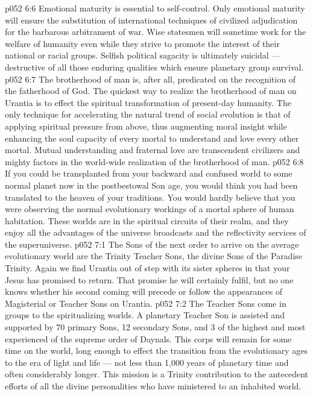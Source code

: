 \vs p052 6:6 \bibnobreakspace {} Emotional maturity is essential to self\hyp{}control. Only emotional maturity will ensure the substitution of international techniques of civilized adjudication for the barbarous arbitrament of war. Wise statesmen will sometime work for the welfare of humanity even while they strive to promote the interest of their national or racial groups. Selfish political sagacity is ultimately suicidal --- destructive of all those enduring qualities which ensure planetary group survival.
\vs p052 6:7 \bibnobreakspace {} The brotherhood of man is, after all, predicated on the recognition of the fatherhood of God. The quickest way to realize the brotherhood of man on Urantia is to effect the spiritual transformation of present\hyp{}day humanity. The only technique for accelerating the natural trend of social evolution is that of applying spiritual pressure from above, thus augmenting moral insight while enhancing the soul capacity of every mortal to understand and love every other mortal. Mutual understanding and fraternal love are transcendent civilizers and mighty factors in the world\hyp{}wide realization of the brotherhood of man.
\vs p052 6:8 \pc If you could be transplanted from your backward and confused world to some normal planet now in the postbestowal Son age, you would think you had been translated to the heaven of your traditions. You would hardly believe that you were observing the normal evolutionary workings of a mortal sphere of human habitation. These worlds are in the spiritual circuits of their realm, and they enjoy all the advantages of the universe broadcasts and the reflectivity services of the superuniverse.
\vs p052 7:1 The Sons of the next order to arrive on the average evolutionary world are the Trinity Teacher Sons, the divine Sons of the Paradise Trinity. Again we find Urantia out of step with its sister spheres in that your Jesus has promised to return. That promise he will certainly fulfil, but no one knows whether his second coming will precede or follow the appearances of Magisterial or Teacher Sons on Urantia.
\vs p052 7:2 The Teacher Sons come in groups to the spiritualizing worlds. A planetary Teacher Son is assisted and supported by 70 primary Sons, 12 secondary Sons, and 3 of the highest and most experienced of the supreme order of Daynals. This corps will remain for some time on the world, long enough to effect the transition from the evolutionary ages to the era of light and life --- not less than 1,000 years of planetary time and often considerably longer. This mission is a Trinity contribution to the antecedent efforts of all the divine personalities who have ministered to an inhabited world.
